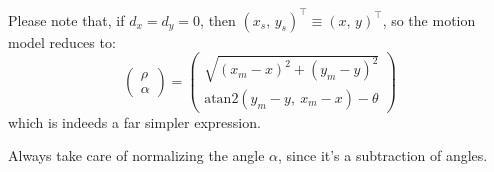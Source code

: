 		Please note that, if $d_x = d_y = 0$, then $(x_s,\, y_s)^\top \equiv (x,\, y)^\top$, so the motion model reduces to: 
		\[
			\left(\begin{array}{c}
				\rho \\ \alpha
			\end{array}\right)
			=
			\left(\begin{array}{ccc}
				\sqrt{(x_m - x)^2 + (y_m - y)^2} \\
				\mathrm{atan2}(y_m - y,\ x_m - x) - \theta
			\end{array}\right)
		\]
		which is indeeds a far simpler expression.
		
		\begin{important}
			Always take care of normalizing the angle $\alpha$, since it's a subtraction of angles.
		\end{important}